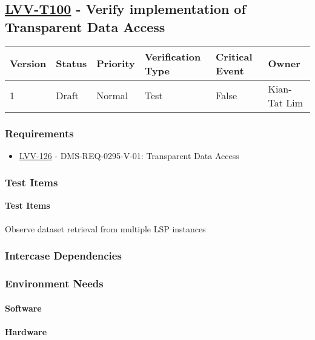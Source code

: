 \subsection{\href{https://jira.lsstcorp.org/secure/Tests.jspa\#/testCase/LVV-T100}{LVV-T100}
    - Verify implementation of Transparent Data Access}\label{lvv-t100}

\begin{longtable}[]{llllll}
\toprule
Version & Status & Priority & Verification Type & Critical Event & Owner
\\\midrule
1 & Draft & Normal &
Test & False & Kian-Tat Lim
\\\bottomrule
\end{longtable}

\subsubsection{Requirements}
\begin{itemize}
\item \href{https://jira.lsstcorp.org/browse/LVV-126}{LVV-126} - DMS-REQ-0295-V-01: Transparent Data Access
\end{itemize}

\subsubsection{Test Items}
\textbf{Test Items\\
}~\\
Observe dataset retrieval from multiple LSP instances



\subsubsection{Intercase Dependencies}

\subsubsection{Environment Needs}

\paragraph{Software}

\paragraph{Hardware}

